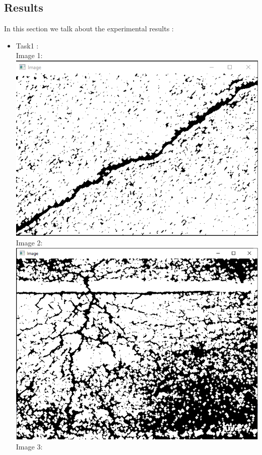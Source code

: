 \documentclass{article}
\begin{document}
\begin{flushleft}
\subsection*{Results}
In this section we talk about the experimental results :
\begin{itemize}
  \item Task1 : \\
  Image 1:\\
  \includegraphics[scale = 0.35]{images/task1_img1.PNG}\\
  Image 2:\\
  \includegraphics[scale = 0.35]{images/task1_img2.PNG}\\
  Image 3:\\

\end{itemize}
\end{flushleft}
\end{document}
